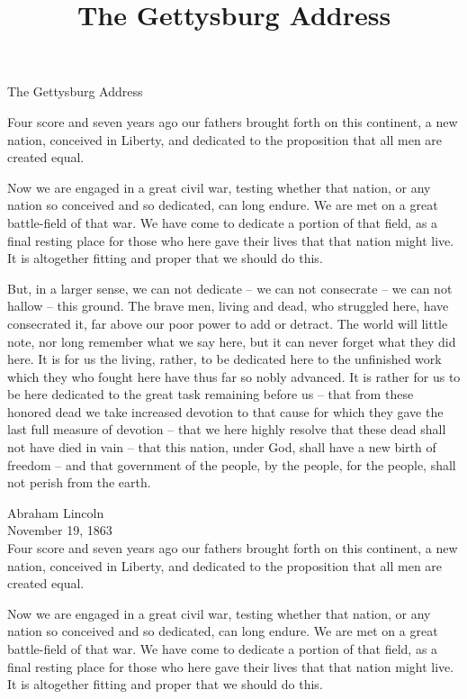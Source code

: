\documentclass[11pt]{article}
\title{The Gettysburg Address}
\begin{document}

\begin{center}
\Large The Gettysburg Address
\end{center}

Four score and seven years ago our fathers brought forth on this continent, a new nation, conceived in Liberty, and dedicated to the proposition that all men are created equal.

Now we are engaged in a great civil war, testing whether that nation, or any nation so conceived and so dedicated, can long endure. We are met on a great battle-field of that war. We have come to dedicate a portion of that field, as a final resting place for those who here gave their lives that that nation might live. It is altogether fitting and proper that we should do this.

But, in a larger sense, we can not dedicate -- we can not consecrate -- we can not hallow -- this ground. The brave men, living and dead, who struggled here, have consecrated it, far above our poor power to add or detract. The world will little note, nor long remember what we say here, but it can never forget what they did here. It is for us the living, rather, to be dedicated here to the unfinished work which they who fought here have thus far so nobly advanced. It is rather for us to be here dedicated to the great task remaining before us -- that from these honored dead we take increased devotion to that cause for which they gave the last full measure of devotion -- that we here highly resolve that these dead shall not have died in vain -- that this nation, under God, shall have a new birth of freedom -- and that government of the people, by the people, for the people, shall not perish from the earth.

Abraham Lincoln\\
November 19, 1863\\


Four score and seven years ago our fathers brought forth on this continent, a new nation, conceived in Liberty, and dedicated to the proposition that all men are created equal.

Now we are engaged in a great civil war, testing whether that nation, or any nation so conceived and so dedicated, can long endure. We are met on a great battle-field of that war. We have come to dedicate a portion of that field, as a final resting place for those who here gave their lives that that nation might live. It is altogether fitting and proper that we should do this.
\end{document}
